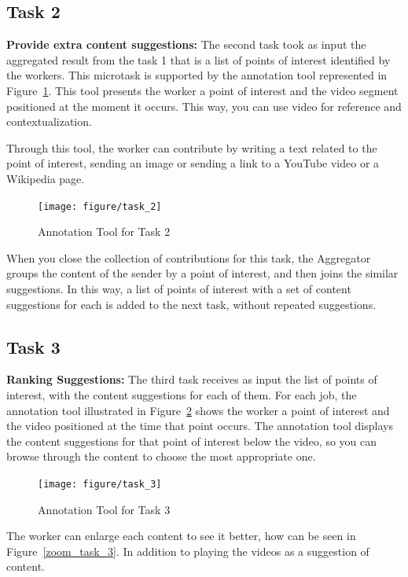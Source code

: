 \subsection{Task 2}

\textbf{Provide extra content suggestions:} The second task took as input the aggregated result from the task 1 that is a list of points of interest identified by the workers. This microtask is supported by the annotation tool represented in Figure~\ref{task_2}. This tool presents the worker a point of interest and the video segment positioned at the moment it occurs. This way, you can use video for reference and contextualization.

Through this tool, the worker can contribute by writing a text related to the point of interest, sending an image or sending a link to a YouTube video or a Wikipedia page.

\begin{figure}[h!]
	\centerline{\texttt{[image: figure/task\_2]}}
	\caption{Annotation Tool for Task 2}
	\label{task_2}
\end{figure}

When you close the collection of contributions for this task, the Aggregator groups the content of the sender by a point of interest, and then joins the similar suggestions. In this way, a list of points of interest with a set of content suggestions for each is added to the next task, without repeated suggestions.


\subsection{Task 3}

\textbf{Ranking Suggestions:} The third task receives as input the list of points of interest, with the content suggestions for each of them. For each job, the annotation tool illustrated in Figure~\ref{task_3} shows the worker a point of interest and the video positioned at the time that point occurs. The annotation tool displays the content suggestions for that point of interest below the video, so you can browse through the content to choose the most appropriate one.

\begin{figure}[h!]
	\centerline{\texttt{[image: figure/task\_3]}}
	\caption{Annotation Tool for Task 3}
	\label{task_3}
\end{figure}

The worker can enlarge each content to see it better, how can be seen in Figure~\ref{zoom_task_3}. In addition to playing the videos as a suggestion of content.		
		
